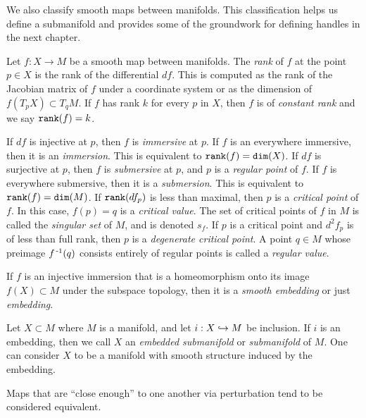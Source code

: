 We also classify smooth maps between manifolds.
This classification helps us define a submanifold and provides some of the groundwork for defining handles in the next chapter.

\begin{defn}[Embedding]
	Let $f:X\to M$ be a smooth map between manifolds.
	The \emph{rank} of $f$ at the point $p\in X$ is the rank of the differential $df$.
	This is computed as the rank of the Jacobian matrix of $f$ under a coordinate system or as the dimension of $f(T_p X)\subset T_q M$.
	If $f$ has rank $k$ for every $p$ in $X$, then $f$ is of \emph{constant rank} and we say $\texttt{rank}(f)=k$.
	
	If $df$ is injective at $p$, then $f$ is \emph{immersive} at $p$.
	If $f$ is an everywhere immersive, then it is an \emph{immersion}.
	This is equivalent to $\texttt{rank}(f)=\texttt{dim}(X)$.
	If $df$ is surjective at $p$, then $f$ is \emph{submersive} at $p$, and $p$ is a \emph{regular point} of $f$.
	If $f$ is everywhere submersive, then it is a \emph{submersion}.
	This is equivalent to $\texttt{rank}(f)=\texttt{dim}(M)$.
	If $\texttt{rank}(df_p)$ is less than maximal, then $p$ is a \emph{critical point} of $f$.
	In this case, $f(p)=q$ is a \emph{critical value}.
	The set of critical points of $f$ in $M$ is called the \emph{singular set} of $M$, and is denoted $s_f$.
	If $p$ is a critical point and $d^2f_p$ is of less than full rank, then $p$ is a \emph{degenerate critical point}.
	A point $q\in M$ whose preimage $f^{\,\text{-}1}(q)$ consists entirely of regular points is called a \emph{regular value}.
	
	If $f$ is an injective immersion that is a homeomorphism onto its image $f(X)\subset M$ under the subspace topology, then it is a \emph{smooth embedding} or just \emph{embedding}.
	
	Let $X\subset M$ where $M$ is a manifold, and let $i:X\hookrightarrow M$ be inclusion.
	If $i$ is an embedding, then we call $X$ an \emph{embedded submanifold} or \emph{submanifold} of $M$.
	One can consider $X$ to be a manifold with smooth structure induced by the embedding.
\end{defn}

Maps that are ``close enough'' to one another via perturbation tend to be considered equivalent.

